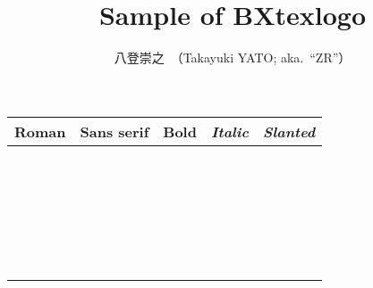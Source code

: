 \documentclass[a4paper]{ltjsarticle}
\title{Sample of \textsf{BXtexlogo}}
\author{八登崇之\ （Takayuki YATO; aka.~``ZR''）}
\newcommand{\LogoSamples}[1]{%
  \textrm{#1} & \textsf{#1} & \textbf{#1} &
  \textit{#1} & \textsl{#1} \\}
\begin{document}
\maketitle

\centering

\begin{tabular}{ccccc}
\textrm{Roman} & \textsf{Sans serif} & \textbf{Bold} &
  \textit{Italic} & \textsl{Slanted} \\ \hline
\LogoSamples{\pTeX}
\LogoSamples{\pTeX}
\LogoSamples{\epTeX}
\LogoSamples{\pLaTeX}
\LogoSamples{\pLaTeXe}
\LogoSamples{\upTeX}
\LogoSamples{\eupTeX}
\LogoSamples{\upLaTeX}
\LogoSamples{\upLaTeXe}
\LogoSamples{\JBibTeX}
\LogoSamples{\pBibTeX}
\LogoSamples{\JTeX}
\LogoSamples{\JLaTeX}
\LogoSamples{\pTeXsT}
\LogoSamples{\XyMTeX}
\LogoSamples{\KETpic}
\LogoSamples{\logoOmega}
\LogoSamples{\logoLambda}
\LogoSamples{\logoAleph}
\LogoSamples{\logoLamed}
\LogoSamples{\BaSiX}
\LogoSamples{\TeXonLaTeX}
\LogoSamples{\OneTeX}
\LogoSamples{\SuyahTeX}
\LogoSamples{\YukidarumaTeX}
\end{tabular}
\end{document}
